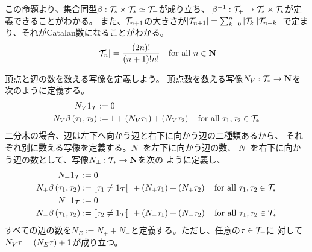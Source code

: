 {	この命題より、集合同型$\beta:{{\mathcal{T}}}_*\times{\ensuremath{{\mathcal{T}}}}_*\simeq{\ensuremath{{\mathcal{T}}}}_+$が成り立ち、
	$\beta^{-1}:{{\mathcal{T}}}_+\to{\ensuremath{{\mathcal{T}}}}_*\times{\ensuremath{{\mathcal{T}}}}_*$が定義できることがわかる。
	また、${{\mathcal{T}}}_{n+1}$の大きさが$|{{\mathcal{T}}}_{n+1}|=\sum_{k=0}^n|{{\mathcal{T}}}_k||{{\mathcal{T}}}_{n-k}|$
	で定まり、それがCatalan数になることがわかる。
	\begin{equation*}\begin{split}
		|{{\mathcal{T}}}_n| = \frac{(2n)!}{(n+1)!n!} \quad\text{for all } n\in\mathbf{N}
	\end{split}\end{equation*}

	頂点と辺の数を数える写像を定義しよう。
	頂点数を数える写像$N_V:{{\mathcal{T}}}_*\to\mathbf{N}$を次のように定義する。
	\begin{equation*}\begin{split}
		N_V1_{{\mathcal{T}}} &:= 0 \\
		N_V\beta\left({\tau_1,\tau_2}\right) &:= 1 + \left({N_V\tau_1}\right)+ \left({N_V\tau_2}\right)
		\quad\text{for all } \tau_1,\tau_2\in{\ensuremath{{\mathcal{T}}}}_*
	\end{split}\end{equation*}
	二分木の場合、辺は左下へ向かう辺と右下に向かう辺の二種類あるから、
	それぞれ別に数える写像を定義する。$N_+$を左下に向かう辺の数、
	$N_-$を右下に向かう辺の数として、写像$N_\pm:{{\mathcal{T}}}_*\to\mathbf{N}$を次の
	ように定義し、
	\begin{equation*}\begin{split}
		N_+1_{{\mathcal{T}}} &:= 0 \\
		N_+\beta\left({\tau_1,\tau_2}\right) &:= [\![\tau_1\neq1_{{\mathcal{T}}}]\!]\; 
		+ \left({N_+\tau_1}\right)+ \left({N_+\tau_2}\right)
		\quad\text{for all } \tau_1,\tau_2\in{\ensuremath{{\mathcal{T}}}}_* \\
		N_-1_{{\mathcal{T}}} &:= 0 \\
		N_-\beta\left({\tau_1,\tau_2}\right) &:= [\![\tau_2\neq1_{{\mathcal{T}}}]\!]\; 
		+ \left({N_-\tau_1}\right)+ \left({N_-\tau_2}\right)
		\quad\text{for all } \tau_1,\tau_2\in{\ensuremath{{\mathcal{T}}}}_* \\
	\end{split}\end{equation*}
	すべての辺の数を$N_E:=N_++N_-$と定義する。ただし、任意の$\tau\in{\ensuremath{{\mathcal{T}}}}_+$に
	対して$N_V\tau=\left({N_E\tau}\right)+1$が成り立つ。

}
